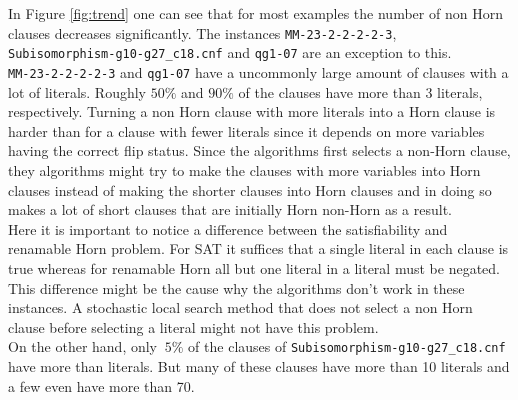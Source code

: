 \documentclass[12pt,a4paper]{article}
\begin{document}
In Figure \ref{fig:trend} one can see that for most examples the number of non Horn clauses decreases significantly. The instances \texttt{MM-23-2-2-2-2-3},\\ \texttt{Subisomorphism-g10-g27\_c18.cnf} and \texttt{qg1-07} are an exception to this.\\

\texttt{MM-23-2-2-2-2-3} and \texttt{qg1-07} have a uncommonly large amount of clauses with a lot of literals. Roughly $50\%$ and $90\%$ of the clauses have more than 3 literals, respectively. Turning a non Horn clause with more literals into a Horn clause is harder than for a clause with fewer literals since it depends on more variables having the correct flip status. Since the algorithms first selects a non-Horn clause, they algorithms might try to make the clauses with more variables into Horn clauses instead of making the shorter clauses into Horn clauses and in doing so makes a lot of short clauses that are initially Horn non-Horn as a result. \\
Here it is important to notice a difference between the satisfiability and renamable Horn problem. For SAT it suffices that a single literal in each clause is true whereas for renamable Horn all but one literal in a literal must be negated. This difference might be the cause why the algorithms don't work in these instances. A stochastic local search method that does not select a non Horn clause before selecting a literal might not have this problem.\\
On the other hand, only $~5\%$ of the clauses of \texttt{Subisomorphism-g10-g27\_c18.cnf} have more than  literals. But many of these clauses have more than 10 literals and a few even have more than 70.\\
\end{document}
